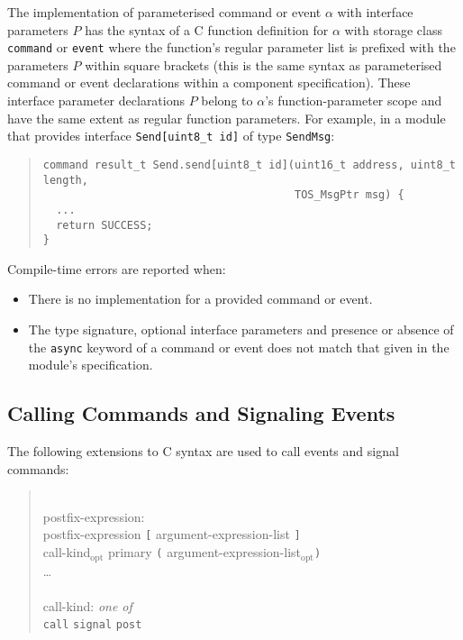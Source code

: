 \documentclass[11pt,letterpaper]{article}
\newcommand{\kw}[1]{{\tt #1}}
\newcommand{\code}[1]{{\tt #1}}
\newcommand{\opt}{$_{\mbox{opt}}$\xspace}
\newcommand{\grammarshift}{\vspace*{-.7cm}}
\newcommand{\grammarindent}{\hspace*{2cm}\= \\ \kill}
\begin{document}
The implementation of parameterised command or event $\alpha$ with interface
parameters $P$ has the syntax of a C function definition for $\alpha$ with
storage class \kw{command} or \kw{event} where the function's regular
parameter list is prefixed with the parameters $P$ within square brackets
(this is the same syntax as parameterised command or event declarations
within a component specification). These interface parameter declarations
$P$ belong to $\alpha$'s function-parameter scope and have the same extent
as regular function parameters. For example, in a module that provides
interface \code{Send[uint8\_t id]} of type \kw{SendMsg}:
\begin{quote} \begin{verbatim}
command result_t Send.send[uint8_t id](uint16_t address, uint8_t length, 
                                       TOS_MsgPtr msg) {
  ...
  return SUCCESS;
}
\end{verbatim} \end{quote}

Compile-time errors are reported when:
\begin{itemize}
\item There is no implementation for a provided command or event.
\item The type signature, optional interface parameters and presence or
absence of the \kw{async} keyword of a command or event does not match that
given in the module's specification.
\end{itemize}

\subsection{Calling Commands and Signaling Events}

The following extensions to C syntax are used to call events and signal
commands:
\begin{quote} \grammarshift \em \begin{tabbing}
\grammarindent
postfix-expression:\\
\>	postfix-expression \kw{[} argument-expression-list \kw{]}\\
\>	call-kind\opt primary \kw{(} argument-expression-list\opt \kw{)}\\
\>	\ldots
\\\\
call-kind: \emph{one of}\\
\>	\kw{call} \kw{signal} \kw{post}
\end{tabbing} \end{quote}
\end{document}
